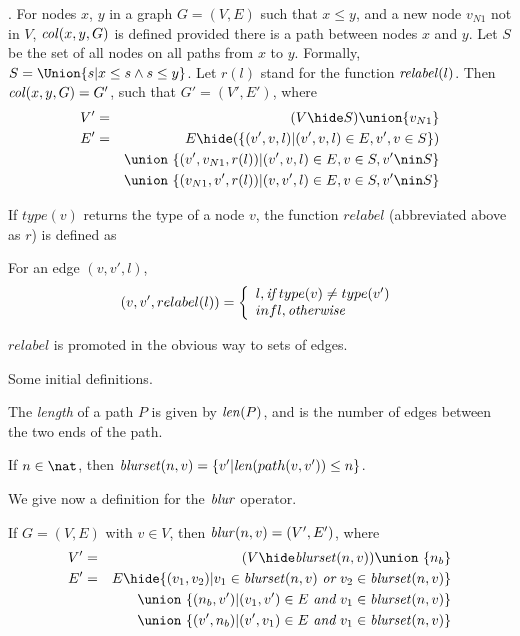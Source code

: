 \documentclass{elsarticle}
\begin{document}
\begin{definition}[$\col$]  \label{def:col}
.  For nodes $x$, $y$ in a graph $G = (V,E)$ such that $x \le y$, and a new node $v_{N1}$ not in $V$,  $\mathit{col}(x,y,G)$ is defined provided there is a path between nodes $x$ and $y$. Let $S$ be the set of all nodes on all paths from $x$ to $y$.
  Formally, $S=\Union \{s|x \le s \land s \le y\}$.
  Let $r(l)$ stand for the function $\mathit{relabel}(l)$. Then $\mathit{col}(x,y,G) =  G'$, such that $G'=(V',E')$, where 
  \begin{eqnarray*}
  V' & = & (V\hide S) \union \{v_{N1}\}     \\
  E' & = &  E\hide (
                   \{(v',v,l)| (v',v,l) \in E, v',v \in S\}
                  )\\
  && \union\ \{(v',v_{N1},r(l))|(v',v,l) \in E, v\in S, v'\nin S\}\\
                   && \union\ \{(v_{N1},v',r(l))|(v,v',l) \in E, v\in S, v' \nin S\}\\
  \end{eqnarray*}
\end{definition}
If $type(v)$ returns the type of a node $v$, the function $relabel$ (abbreviated above as $r$) is defined as 
\begin{definition}[$relabel$] \label{def:relabel}
  For an edge $(v,v',l)$, 
  \[
   (v,v',relabel(l)) = \left\{
   \begin{array}{l}
      l,    {\emph{if}}\; type(v) \neq type(v') \\
      infl, \emph{otherwise}
   \end{array}   \right.
  \]
\end{definition}
\noindent
$relabel$ is promoted in the obvious way to sets of edges.


Some initial definitions.

The \emph{length} of a path $P$ is given by $\mathit{len}(P)$, and is the number of edges between the two ends of the path.

If $n \in \nat$, then $\mathit{blurset}(n,v) = \{v'|\mathit{len}(path(v,v')) \leq n\}$.

We give now a definition for the $\blur$ operator.

\begin{definition}[$\blur$] \label{def:blur}
  If $G = (V,E)$ with $v \in V$, then $\mathit{blur}(n,v) = (V',E')$, where
  \begin{eqnarray*}
  V' &=& (V\hide \blurset(n,v)) \union\ \{n_b\}\\
  E' &=& E\hide \{(v_1,v_2)| v_1 \in \blurset(n,v) ~\emph{or}~ v_2 \in \blurset(n,v)\}\\
  &&\union\ \{(n_b,v')|(v_1,v') \in E ~\emph{and}~ v_1 \in \blurset(n,v)\} \\
  &&\union\ \{(v',n_b)|(v',v_1) \in E ~\emph{and}~ v_1 \in \blurset(n,v)\} \\
  \end{eqnarray*}
\end{definition}
\end{document}
